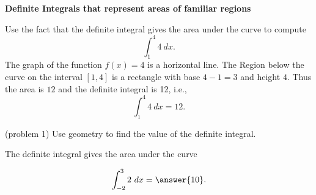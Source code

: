 \documentclass{ximera}
\begin{document}
\begin{center}
\textbf{Definite Integrals that represent areas of familiar regions}
\end{center}


\begin{example}[example 1]
Use the fact that the definite integral gives the area under the curve to compute
\[\int_{1}^4 4 \ dx.\]
The graph of the function $f(x) = 4$ is a horizontal line. The Region below the curve on the interval $[1,4]$ is a rectangle with base $4-1=3$
and height $4$.  Thus the area is $12$ and the definite integral is 12, i.e.,
\[\int_1^4 4 \ dx =12.\]

\begin{image}
\end{image}

\end{example}


\begin{problem}(problem 1)
Use geometry to find the value of the definite integral.
\begin{hint}
The definite integral gives the area under the curve
\end{hint}
\[\int_{-2}^{3} 2 \ dx = \answer{10}.\]
\end{problem}
\end{document}
